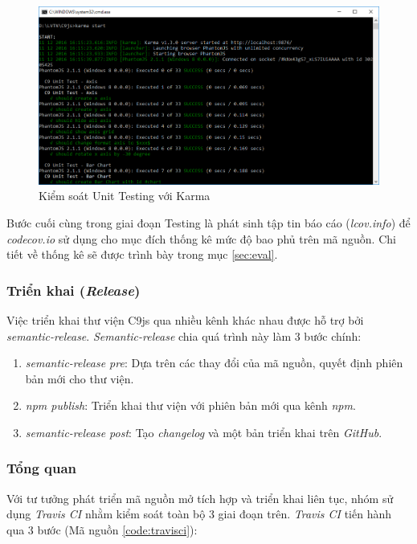 \documentclass[12pt,a4paper]{article}
\begin{document}
\begin{figure}[!h]
	\begin{center}
    \includegraphics[scale=0.6]{image/karma_1}
    \caption{Kiểm soát Unit Testing với Karma}
    \label{fig:karma_1}
	\end{center}
\end{figure}

Bước cuối cùng trong giai đoạn Testing là phát sinh tập tin báo cáo (\textit{lcov.info}) để \textit{codecov.io} sử dụng cho mục đích thống kê mức độ bao phủ trên mã nguồn. Chi tiết về thống kê sẽ được trình bày trong mục \ref{sec:eval}.

\subsubsection{Triển khai (\textit{Release})}
Việc triển khai thư viện C9js qua nhiều kênh khác nhau được hỗ trợ bởi \textit{semantic-release}. \textit{Semantic-release} chia quá trình này làm 3 bước chính:

\begin{enumerate}
\item \emph{semantic-release pre}: Dựa trên các thay đổi của mã nguồn, quyết định phiên bản mới cho thư viện.
\item \emph{npm publish}: Triển khai thư viện với phiên bản mới qua kênh \textit{npm}.
\item \emph{semantic-release post}: Tạo \textit{changelog} và một bản triển khai trên \textit{GitHub}.
\end{enumerate}

\subsubsection*{Tổng quan}
Với tư tưởng phát triển mã nguồn mở tích hợp và triển khai liên tục, nhóm sử dụng \textit{Travis CI} nhằm kiểm soát toàn bộ 3 giai đoạn trên. \textit{Travis CI} tiến hành qua 3 bước (Mã nguồn \ref{code:travisci}):
\end{document}

